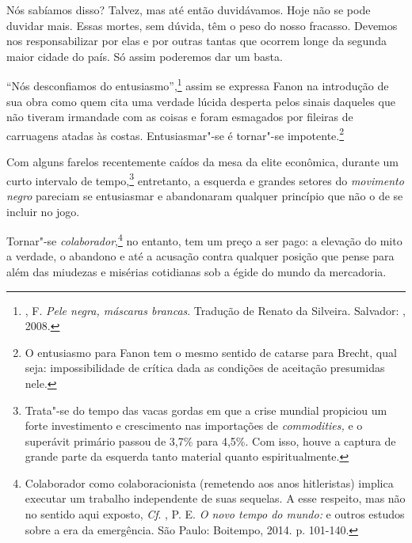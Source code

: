 Nós sabíamos disso? Talvez, mas até então duvidávamos. Hoje não se pode
duvidar mais. Essas mortes, sem dúvida, têm o peso do nosso fracasso.
Devemos nos responsabilizar por elas e por outras tantas que ocorrem
longe da segunda maior cidade do país. Só assim poderemos dar um basta.

``Nós desconfiamos do entusiasmo'',\footnote{, F. \emph{Pele negra,
  máscaras brancas}. Tradução de Renato da Silveira. Salvador: ,
  2008.} assim se expressa Fanon na introdução de sua obra como quem
cita uma verdade lúcida desperta pelos sinais daqueles que não tiveram
irmandade com as coisas e foram esmagados por fileiras de carruagens
atadas às costas. Entusiasmar"-se é tornar"-se impotente.\footnote{O
  entusiasmo para Fanon tem o mesmo sentido de catarse para Brecht, qual
  seja: impossibilidade de crítica dada as condições de aceitação
  presumidas nele.}

Com alguns farelos recentemente caídos da mesa da elite econômica,
durante um curto intervalo de tempo,\footnote{Trata"-se do tempo das vacas
  gordas em que a crise mundial propiciou um forte investimento e
  crescimento nas importações de \emph{commodities,} e o superávit
  primário passou de 3,7\% para 4,5\%. Com isso, houve a captura de
  grande parte da esquerda tanto material quanto espiritualmente.}
entretanto, a esquerda e grandes setores do \emph{movimento negro}
pareciam se entusiasmar e abandonaram qualquer princípio que não o de se
incluir no jogo.

Tornar"-se \emph{colaborador},\footnote{Colaborador como colaboracionista
  (remetendo aos anos hitleristas) implica executar um trabalho
  independente de suas sequelas. A esse respeito, mas não no sentido
  aqui exposto, \emph{Cf}. , P. E. \emph{O novo tempo do mundo:} e
  outros estudos sobre a era da emergência. São Paulo: Boitempo, 2014.
  p. 101-140.} no entanto, tem um preço a ser pago: a elevação do mito
a verdade, o abandono e até a acusação contra qualquer posição que pense
para além das miudezas e misérias cotidianas sob a égide do mundo da
mercadoria.

